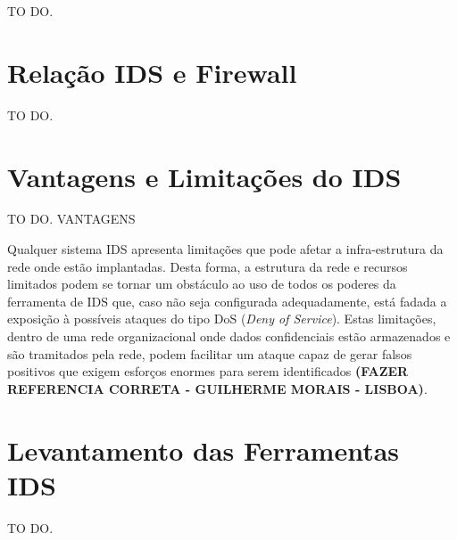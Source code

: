 		TO DO.

	\section{Relação IDS e Firewall}
	\label{sec:IDS_Firewall}

		TO DO.

	\section{Vantagens e Limitações do IDS}
	\label{sec:IDS_VeL}

		TO DO. VANTAGENS
		
	Qualquer sistema IDS apresenta limitações que pode afetar a infra-estrutura da rede onde estão implantadas. Desta forma, a estrutura da rede e recursos limitados podem se tornar um obstáculo ao uso de todos os poderes da ferramenta de IDS que, caso não seja configurada adequadamente, está fadada a exposição à possíveis ataques do tipo DoS (\textit{Deny of Service}). Estas limitações, dentro de uma rede organizacional onde dados confidenciais estão armazenados e são tramitados pela rede, podem facilitar um ataque capaz de gerar falsos positivos que exigem esforços enormes para serem identificados \textbf{(FAZER REFERENCIA CORRETA - GUILHERME MORAIS - LISBOA)}.

	\section{Levantamento das Ferramentas IDS}
	\label{sec:IDS_Ferramentas}
	

		TO DO.


